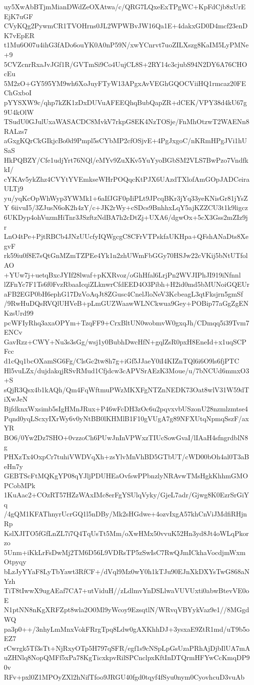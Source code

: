 uy5XwAbBTjmMianDWdZeOXAtwa/c/QRG7LQxeExTPgWC+KpFdCjb8xUrEEjK7uGF
CVyKQg2PywmCR1TVOHrns0JL2WPWBvJW16Qa1E+4dakxGD0D4mcf23enDK7vEpER
t1Mu6O07u4ihG3fADo6ouYK0A0nP59N/xwYCnrvt7uoZILXszg8KaIM5LyPMNe+9
5CVZcnrRxaJvJGf1R/GVTmSi9Co4UujCL8S+2RY14c3cjubS94N2DY6A76CHOcEu
5M2zO+GY595YM9wh6XoJuyFTyW13APgxAvVEGhGQOCViiHQ1rmcaz20FEChGxboI
pYYSXW9c/qhp7kZK1zDxDUVuAFEEQhqBubQapZR+dCEK/VPY38d4kU67g9U4kOlW
TSudU0GJulUxaWASACDC8MvkV7rkpG8EK4NzTOSje/FnMhOtzwT2WAENn8RALzs7
aGxgKQrCkGIkjcBo0d9Pmpl5sCYbMP2cfOSjvE+4PgJxgoC/nKRmHPgJVi1hUSaS
HkPQBZY/Cfe1udjYrt76NQl/eMYv9ZuXKv5YuYyoBGbSM2VLS7BwPzo7VndfkkI/
cYKAv5ykZhz4CVYtYVEmkseWHrPOQqcKtPJX6UAzdTXlofAmGOpJADCeiraULTj9
yu/yqKcOpWhWyp3YWMk1+6aIfJGF0pIiPLt9JPcqBKr3jYq33yeKNisGr81jYsZY
6iivuI5/3ZJusN6oK2h4zY/c+JK2rWy+cSDcs9BnhhxLqY5ajKZZCU3t1k9ligcz
6UKDyp4ohVuzmHiTnr3JSzftzNdBA7h2cDtZj+UXA6/dgwOx+5cX3Gss2mZIz9jr
LnO4tPe+PjtRBCb4JNzUUcfyIQWgcgC8CFrVTPskfaUKHpa+QFshANaDts8XegvF
rk59iu0f8E7sQtGnMZmTZPEe4Yk1n2zhUWmFbGGy70HSJw22cVKij5bNtUTfolAO
+YUw7j+uetqBxcJYIf28lwaf+pKXRvoz/oGhHfal6LrjPn2WVJIPhJI919iNfnnl
lZFnYc7F1Ts6f0FvzRbaaIcqiZLknwrCfdEED4O3Pibh+H2id0md5bMUNoiGQEUr
aFB2EGP0bH6ephG17DzVoAqJt8ZGusc4CnelJloNeV3KcbeagL3qtFksjrn5gmSf
/9RwHuDQsRVQlUHVeB+pLmGUZWaawWLNCkwua9Gey+POBip77aGgZgENKzsUrd99
pcWFIyRhq3axaOPYm+TzqFF9+CrxBltUN0wobmvW0gxqJh/CDmqq5i39Tvm7ENCv
GavRzz+CWY+Nu3s3sGg/wsj1y0BubhDwcHfN+gqlZsR0pxH8EneId+x1uqSCPFcc
d1cQq1bcOXamSG6Fg/ClsGc2tw8h7g+iGf5JJaeY0iI4KIZnTQl6i6O9ls6fjPTC
Hl5vuLZx/dujdakqjRSvRMud1Cfjdcw3cAPVSrAEzK3Moue/u/7bNCUd6mmxO3+S
sQjR3Qsx4b1kAQh/Qm4FqWftmuPWzMKXFgNTZnNEDK73Oat8wlV31W59dTiXwJeN
BjfdknxWxsimb5sIgHMnJRux+P46wFcDH3zOc6u2pqvxvbUSzonU28nzmlzmtse4
Pqnd0yqLScxyIXrWy6v0yNtBB0lKHMlB1F10gVUgA7g89NFXUtqNpmqSszF/axYR
BO6/0Yw2Dz7SHO+0vzzoCh6PUwJnInVPWxzTIUcSowGvaI/lIAaH4sfngrdblN8g
PHXzTx4OxpCr7tuhiVWDVqXh+zsYlvMnVhBD5GTbUT/cWD00bOh4al0T3aBeHn7y
GEBTScFtMQKgYP08qYJljPDUHEaOvfswPPbnzlyNRAvwTMsHgkKhhmGMOPCobMPk
1KuAac2+COzRT57HZzWAxIMc8erFgYSUlqVyky/GjeL7adr/Gjwg8K0EzrSrGiYq
/4gQM1KFAThnyrUcrGQ1l5nDBy/Mk2sHGdwe+4ozvIxgA57khCnViJMdfiRHjnRp
KslXJITO5fGfLnZL7i7Q4TqUsTt5Mm/oXwHMx50vvuK52Hn3yd8Jt4oWLqPkorzo
5Unm+iKkLrFsDwMj2TM6D56L9VDRsTP5zSwIsC7RwQJmICkhaVocdjmWxmOtpyqy
bLzJyYYaF8LyTbYawt3RfCF+/dVql9Mz0wY0h1kTJu90EJnXkDXYsTwG868aNYzh
TiT8tIwwX9ugAEaf7CA7+utViduH//zLdlmvYnDSLlwaVUVUxti0abwBtevVE0oE
N1ptNN8nKgXRFZpt8wla2O0Ml9yWcoy9EzsqtlN/WRvqVBYykVaz9e1//8MGgdWQ
pa3p0++/3nhyLmMnxVokFRrgTpq8Ldw0gAXKhhDJ+3ysxaE9ZtR1md/uT9b5oEZ7
rCwrgk5Tf3sTt+NjRxyOTp5H797qSFR/egf1s9cNSpLpGsUzaPRhAjDjbIlUA7mA
uZHNlq8NopQMFf5xPa78KgTicxkpvRilSPCnclpxKftInDTQrmHFYwCcKmqDP90v
RFv+pxl0Z1MPOyZXl2hNifTfoo9JRGU40fgd0tqyf4fSyu0nym0CyovhcuD3vuAb
